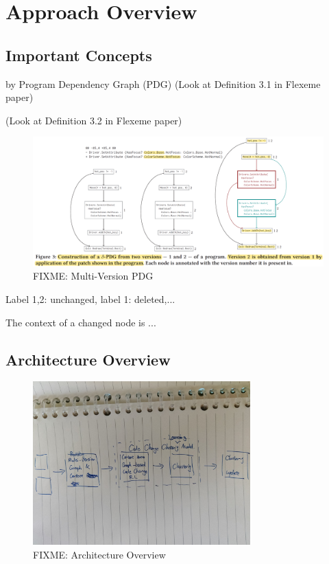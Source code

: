 \section{Approach Overview}
\label{overview:sec}

\subsection{Important Concepts}
\label{concepts:sec}

\begin{Definition}
  by Program Dependency Graph (PDG)
  (Look at Definition 3.1 in Flexeme paper)
\end{Definition}

\begin{Definition}
(Look at Definition 3.2 in Flexeme paper)
\end{Definition}

\begin{figure}[t]
	\centering
        \includegraphics[width=5.3in]{figures/multi-version-graph.png}
        \vspace{-6pt}
	\caption{FIXME: Multi-Version PDG}
	\label{fig:pdg}
\end{figure}

\begin{Definition}
Label 1,2: unchanged, label 1: deleted,...
\end{Definition}


\begin{Definition}[Context]
The context of a changed node is ...
\end{Definition}

\subsection{Architecture Overview}

\begin{figure}[t]
	\centering
        \includegraphics[width=3.3in]{figures/overview.jpg}
        \vspace{-6pt}
	\caption{FIXME: Architecture Overview}
	\label{fig:overview}
\end{figure}
